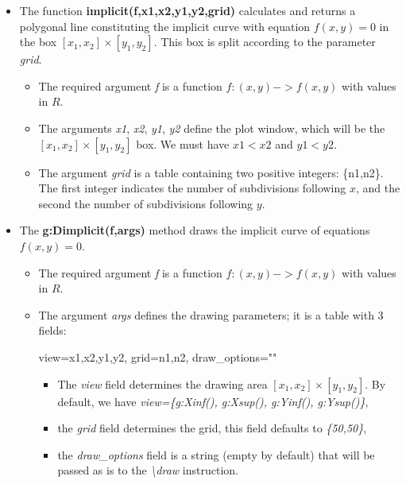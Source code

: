 \begin{itemize}
    \item The function \textbf{implicit(f,x1,x2,y1,y2,grid)} calculates and returns a polygonal line constituting the implicit curve with equation $f(x,y)=0$ in the box $[x_1,x_2]\times[y_1,y_2]$. This box is split according to the parameter \emph{grid}.

\begin{itemize}
    \item The required argument \emph{f} is a function \(f: (x,y) -> f(x,y)\) with values ​​in \(R\).
    \item The arguments \emph{x1}, \emph{x2}, \emph{y1}, \emph{y2} define the plot window, which will be the $[x_1,x_2]\times[y_1,y_2]$ box. We must have \(x1<x2\) and \(y1<y2\).
    \item The argument \emph{grid} is a table containing two positive integers: \{n1,n2\}. The first integer indicates the number of subdivisions following $x$, and the second the number of subdivisions following $y$.
\end{itemize}

    \item The \textbf{g:Dimplicit(f,args)} method draws the implicit curve of equations $f(x,y)=0$.

\begin{itemize}
    \item The required argument \emph{f} is a function \(f: (x,y) -> f(x,y)\) with values ​​in \(R\).
    \item The argument \emph{args} defines the drawing parameters; it is a table with 3 fields:

\begin{TeXcode}
{ view={x1,x2,y1,y2}, grid={n1,n2}, draw_options="" }
\end{TeXcode}
\begin{itemize}
    \item The \emph{view} field determines the drawing area $[x_1,x_2]\times[y_1,y_2]$. By default, we have \emph{view=\{g:Xinf(), g:Xsup(), g:Yinf(), g:Ysup()\}},
    \item the \emph{grid} field determines the grid, this field defaults to \emph{\{50,50\}},
    \item the \emph{draw\_options} field is a string (empty by default) that will be passed as is to the \emph{\textbackslash draw} instruction.
\end{itemize}
\end{itemize}
\end{itemize}

